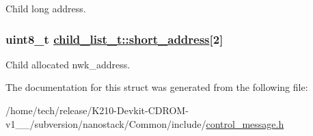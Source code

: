 Child long address. \hypertarget{structchild__list__t_95377fd3af74baa4bd3661116613c44c}{
\subsubsection[short\_\-address]{\setlength{\rightskip}{0pt plus 5cm}uint8\_\-t \hyperlink{structchild__list__t_95377fd3af74baa4bd3661116613c44c}{child\_\-list\_\-t::short\_\-address}\mbox{[}2\mbox{]}}}
\label{structchild__list__t_95377fd3af74baa4bd3661116613c44c}


Child allocated nwk\_\-address. 

The documentation for this struct was generated from the following file:\begin{CompactItemize}
\item 
/home/tech/release/K210-Devkit-CDROM-v1\_\_/subversion/nanostack/Common/include/\hyperlink{control__message_8h}{control\_\-message.h}\end{CompactItemize}

